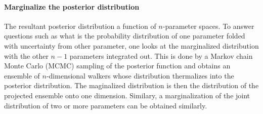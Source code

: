 \paragraph{Marginalize the posterior distribution} The resultant posterior distribution a function of $n$-parameter spaces.
To answer questions such as what is the probability distribution of one parameter folded with uncertainty from other parameter, one looks at the marginalized distribution with the other $n-1$ parameters integrated out.
This is done by a Markov chain Monte Carlo (MCMC) sampling of the posterior function and obtains an ensemble of $n$-dimensional walkers whose distribution thermalizes into the posterior distribution.
The maginalized distribution is then the distribution of the projected ensemble onto one dimension.
Similary, a marginalization of the joint distribution of two or more parameters can be obtained similarly.



